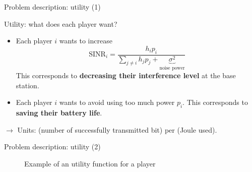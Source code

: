 \begin{frame}{Problem description: utility (1)}
    \begin{exampleblock}{Utility: what does each player want?}
        \begin{itemize}
            \item Each player $i$ wants to increase
            \[ \text{SINR}_i = \frac{h_ip_i}{\sum_{j\neq i} h_jp_j 
                + \underbrace{\sigma^2}_\text{noise power}} \]
            This corresponds to \textbf{decreasing their interference level} at the base station.
            \item Each player $i$ wants to avoid using too much power $p_i$. This corresponds
            to \textbf{saving their battery life}.
        \end{itemize}
    \end{exampleblock}

    \vspace{0.5cm}
    $\to$ Units: (number of successfully transmitted bit) per (Joule used).
\end{frame}

\begin{frame}{Problem description: utility (2)}
    \begin{figure}
        \centering
        \caption{Example of an utility function for a player}
    \end{figure}
\end{frame}



